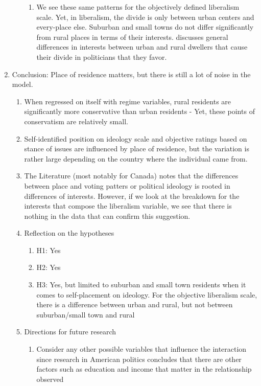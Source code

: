 \documentclass[12pt]{article}
\begin{document}
\begin{enumerate}
\begin{enumerate}
\begin{enumerate}
		\item We see these same patterns for the objectively defined liberalism scale. Yet, in liberalism, the divide is only between urban centers and every-place else. Suburban and small towns do not differ significantly from rural places in terms of their interests. \cite{walks_city-suburban_2005} discusses general differences in interests between urban and rural dwellers that cause their divide in politicians that they favor.
	\end{enumerate}
\end{enumerate}
\item Conclusion: Place of residence matters, but there is still a lot of noise in the model.
\begin{enumerate}
	\item When regressed on itself with regime variables, rural residents are significantly more conservative than urban residents - Yet, these points of conservatism are relatively small. 
	\item Self-identified position on ideology scale and objective ratings based on stance of issues are influenced by place of residence, but the variation is rather large depending on the country where the individual came from. 
	\item The Literature (most notably \cite{walks_city-suburban_2005} for Canada) notes that the differences between place and voting patters or political ideology is rooted in differences of interests. However, if we look at the breakdown for the interests that compose the liberalism variable, we see that there is nothing in the data that can confirm this suggestion. 
	\item Reflection on the hypotheses
	\begin{enumerate}
		\item H1: Yes
		\item H2: Yes
		\item H3: Yes, but limited to suburban and small town residents when it comes to self-placement on ideology. For the objective liberalism scale, there is a difference between urban and rural, but not between suburban/small town and rural
	\end{enumerate}
	\item Directions for future research
	\begin{enumerate}
		\item Consider any other possible variables that influence the interaction since research in American politics concludes that there are other factors such as education and income that matter in the relationship observed \citep{gimpel_rural_2006}

\end{enumerate}
\end{enumerate}
\end{enumerate}
\end{document}
